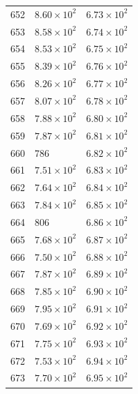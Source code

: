 \begin{table}[H]
\begin{tabular}{lll}
652 & $\displaystyle 8.60 \times 10^{2}$ & $\displaystyle 6.73 \times 10^{2}$ \\
653 & $\displaystyle 8.58 \times 10^{2}$ & $\displaystyle 6.74 \times 10^{2}$ \\
654 & $\displaystyle 8.53 \times 10^{2}$ & $\displaystyle 6.75 \times 10^{2}$ \\
655 & $\displaystyle 8.39 \times 10^{2}$ & $\displaystyle 6.76 \times 10^{2}$ \\
656 & $\displaystyle 8.26 \times 10^{2}$ & $\displaystyle 6.77 \times 10^{2}$ \\
657 & $\displaystyle 8.07 \times 10^{2}$ & $\displaystyle 6.78 \times 10^{2}$ \\
658 & $\displaystyle 7.88 \times 10^{2}$ & $\displaystyle 6.80 \times 10^{2}$ \\
659 & $\displaystyle 7.87 \times 10^{2}$ & $\displaystyle 6.81 \times 10^{2}$ \\
660 & 786 & $\displaystyle 6.82 \times 10^{2}$ \\
661 & $\displaystyle 7.51 \times 10^{2}$ & $\displaystyle 6.83 \times 10^{2}$ \\
662 & $\displaystyle 7.64 \times 10^{2}$ & $\displaystyle 6.84 \times 10^{2}$ \\
663 & $\displaystyle 7.84 \times 10^{2}$ & $\displaystyle 6.85 \times 10^{2}$ \\
664 & 806 & $\displaystyle 6.86 \times 10^{2}$ \\
665 & $\displaystyle 7.68 \times 10^{2}$ & $\displaystyle 6.87 \times 10^{2}$ \\
666 & $\displaystyle 7.50 \times 10^{2}$ & $\displaystyle 6.88 \times 10^{2}$ \\
667 & $\displaystyle 7.87 \times 10^{2}$ & $\displaystyle 6.89 \times 10^{2}$ \\
668 & $\displaystyle 7.85 \times 10^{2}$ & $\displaystyle 6.90 \times 10^{2}$ \\
669 & $\displaystyle 7.95 \times 10^{2}$ & $\displaystyle 6.91 \times 10^{2}$ \\
670 & $\displaystyle 7.69 \times 10^{2}$ & $\displaystyle 6.92 \times 10^{2}$ \\
671 & $\displaystyle 7.75 \times 10^{2}$ & $\displaystyle 6.93 \times 10^{2}$ \\
672 & $\displaystyle 7.53 \times 10^{2}$ & $\displaystyle 6.94 \times 10^{2}$ \\
673 & $\displaystyle 7.70 \times 10^{2}$ & $\displaystyle 6.95 \times 10^{2}$ \\

\end{tabular}
\end{table}

